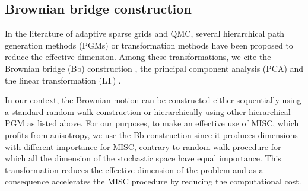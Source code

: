 \FloatBarrier

%



\subsection{Brownian bridge construction}\label{sec:Brwonian bridge construction}
In the literature of adaptive sparse grids and  QMC, several hierarchical path generation methods (PGMs) or transformation methods have been proposed to reduce the effective dimension. Among these transformations, we cite  the Brownian
bridge (Bb)  construction \cite{morokoff1994quasi,moskowitz1996smoothness,caflisch1997valuation}, the principal component analysis (PCA)  \cite{acworth1998comparison} and the linear transformation (LT) \cite{imai2004minimizing}.

In our context, the Brownian motion can be constructed either sequentially using a standard random walk construction or hierarchically using   other hierarchical PGM as listed above. For our purposes, to make an effective use of MISC, which profits from anisotropy, we use the Bb construction since it produces  dimensions with different importance for MISC, contrary to random walk procedure for which all the dimension of the stochastic space have equal importance.  This transformation  reduces the effective dimension  of the problem and as a consequence accelerates the MISC procedure by reducing the computational cost.


